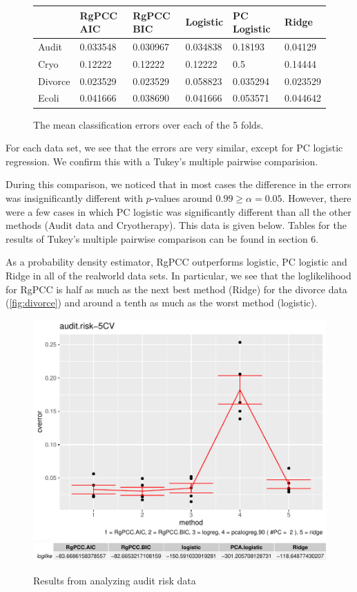\documentclass[main.tex]{subfiles}
\begin{document}
\begin{figure}[H]
	\begin{tabular}{l l l l l l} \hline
    & RgPCC AIC & RgPCC BIC & Logistic & PC Logistic & Ridge \\ \hline
    \rowcolor{LightCyan}
    Audit & 0.033548 & 0.030967 & 0.034838    & 0.18193 & 0.04129\\
    Cryo & 0.12222 & 0.12222 & 0.12222         &  0.5 & 0.14444 \\
    \rowcolor{LightCyan}
    Divorce & 0.023529 & 0.023529 & 0.058823 & 0.035294 & 0.023529\\
    Ecoli & 0.041666 & 0.038690 & 0.041666  & 0.053571 & 0.044642\\ \hline
	\end{tabular}
	\caption{The mean classification errors over each of the 5 folds.}
\end{figure}
For each data set, we see that the errors are very similar, except for PC logistic regression. We confirm this with a Tukey's multiple pairwise comparision.

During this comparison, we noticed that in most cases the difference in the errors was insignificantly different with $p$-values around $0.99 \geq \alpha = 0.05$. However, there were a few cases in which PC logistic was significantly different than all the other methods (Audit data and Cryotherapy). This data is given below. Tables for the results of Tukey's multiple pairwise comparison can be found in section 6.

As a probability density estimator, RgPCC outperforms logistic, PC logistic and Ridge in all of the realworld data sets. In particular, we see that the loglikelihood for RgPCC is half as much as the next best method (Ridge) for the divorce data (\ref{fig:divorce}) and around a tenth as much as the worst method (logistic). 


\begin{figure}[H]
	\includegraphics[width = 0.5 \textwidth]{R-code/data/audit.risk-5CVgraph.pdf}
	\includegraphics[width = \textwidth]{R-code/data/audit.risk-5CVloglike.pdf}
	\label{fig:audit}
	\caption{Results from analyzing audit risk data}
\end{figure}
\end{document}
